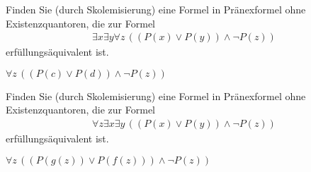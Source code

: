 
\begin{exercise}[173]
Finden Sie (durch Skolemisierung) eine Formel in Pränexformel ohne Existenzquantoren,
die zur Formel
\begin{align*}
  \exists x \exists y \forall z\, ((P(x) \lor P(y))\land \neg P(z))
\end{align*}
erfüllungsäquivalent ist.
\end{exercise}


\begin{solution}
	$\forall z\, ((P(c) \lor P(d))\land \neg P(z))$
\end{solution}



\begin{exercise}[174]
Finden Sie (durch Skolemisierung) eine Formel in Pränexformel ohne Existenzquantoren,
die zur Formel
\begin{align*}
  \forall z \exists x \exists y \, ((P(x) \lor P(y))\land \neg P(z))
\end{align*}
erfüllungsäquivalent ist.
\end{exercise}


\begin{solution}
	$\forall z \, ((P(g(z)) \lor P(f(z)))\land \neg P(z))$
\end{solution}


